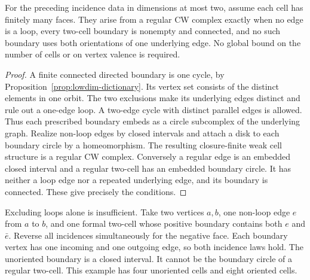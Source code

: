 \begin{proposition}
\label{prop:lowdim-regular}
For the preceding incidence data in dimensions at most two, assume
each cell has finitely many faces. They arise from a regular CW
complex exactly when no edge is a loop, every two-cell boundary
is nonempty and connected, and no such boundary uses both
orientations of one underlying edge. No global bound on the
number of cells or on vertex valence is required.
\end{proposition}
\begin{proof}
A finite connected directed boundary is one cycle, by
Proposition~\ref{prop:lowdim-dictionary}. Its vertex set consists
of the distinct elements in one orbit. The two exclusions make
its underlying edges distinct and rule out a one-edge loop.
A two-edge cycle with distinct parallel edges is allowed.
Thus each prescribed boundary embeds as a circle subcomplex of
the underlying graph. Realize non-loop edges by closed intervals
and attach a disk to each boundary circle by a homeomorphism.
The resulting closure-finite weak cell structure is a regular
CW complex. Conversely a regular edge is an embedded closed
interval and a regular two-cell has an embedded boundary circle.
It has neither a loop edge nor a repeated underlying edge, and
its boundary is connected. These give precisely the conditions.
\end{proof}

Excluding loops alone is insufficient. Take two vertices $a,b$,
one non-loop edge $e$ from $a$ to $b$, and one formal two-cell
whose positive boundary contains both $e$ and $\bar e$.
Reverse all incidences simultaneously for the negative face.
Each boundary vertex has one incoming and one outgoing edge,
so both incidence laws hold. The unoriented boundary is a closed
interval. It cannot be the boundary circle of a regular two-cell.
This example has four unoriented cells and eight oriented cells.

